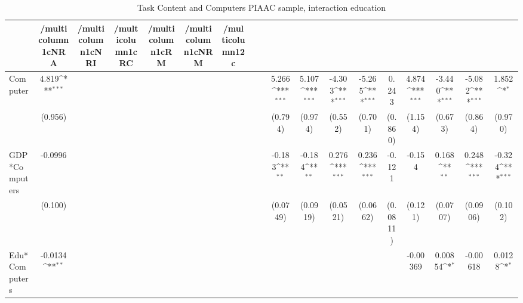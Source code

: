 \begin{table}[htbp]\centering
\def\sym#1{\ifmmode^{#1}\else\(^{#1}\)\fi}
\caption{Task Content and Computers PIAAC sample, interaction education }
\begin{tabular}{l*{17}{c}}
\hline\hline
            &/multicolumn{1}{c}{NRA}&/multicolumn{1}{c}{NRI}&/multicolumn{1}{c}{RC}&/multicolumn{1}{c}{RM}&/multicolumn{1}{c}{NRM}&/multicolumn{12}{c}{}                                                                                                                                                                                                                                                  \\
\hline
Computer    &       4.819\sym{***}&                     &                     &                     &                     &                     &                     &                     &       5.266\sym{***}&       5.107\sym{***}&      -4.303\sym{***}&      -5.265\sym{***}&       0.243         &       4.874\sym{***}&      -3.440\sym{***}&      -5.082\sym{***}&       1.852\sym{*}  \\
            &     (0.956)         &                     &                     &                     &                     &                     &                     &                     &     (0.794)         &     (0.974)         &     (0.552)         &     (0.701)         &     (0.860)         &     (1.154)         &     (0.673)         &     (0.864)         &     (0.970)         \\
[1em]
GDP*Computers&     -0.0996         &                     &                     &                     &                     &                     &                     &                     &      -0.183\sym{**} &      -0.184\sym{**} &       0.276\sym{***}&       0.236\sym{***}&      -0.121         &      -0.154         &       0.168\sym{**} &       0.248\sym{***}&      -0.324\sym{***}\\
            &     (0.100)         &                     &                     &                     &                     &                     &                     &                     &    (0.0749)         &    (0.0919)         &    (0.0521)         &    (0.0662)         &    (0.0811)         &     (0.121)         &    (0.0707)         &    (0.0906)         &     (0.102)         \\
[1em]
Edu*Computers&     -0.0134\sym{**} &                     &                     &                     &                     &                     &                     &                     &                     &                     &                     &                     &                     &    -0.00369         &     0.00854\sym{*}  &    -0.00618         &      0.0128\sym{*}  \\

\end{tabular}
\end{table}

